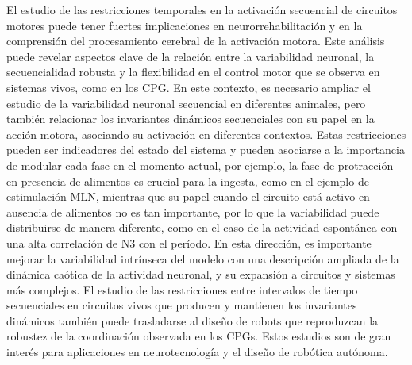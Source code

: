 El estudio de las restricciones temporales en la activación secuencial de circuitos motores puede tener fuertes implicaciones en neurorrehabilitación y en la comprensión del procesamiento cerebral de la activación motora. Este análisis puede revelar aspectos clave de la relación entre la variabilidad neuronal, la secuencialidad robusta y la flexibilidad en el control motor que se observa en sistemas vivos, como en los CPG. En este contexto, es necesario ampliar el estudio de la variabilidad neuronal secuencial en diferentes animales, pero también relacionar los invariantes dinámicos secuenciales con su papel en la acción motora, asociando su activación en diferentes contextos. Estas restricciones pueden ser indicadores del estado del sistema y pueden asociarse a la importancia de modular cada fase en el momento actual, por ejemplo, la fase de protracción en presencia de alimentos es crucial para la ingesta, como en el ejemplo de estimulación MLN, mientras que su papel cuando el circuito está activo en ausencia de alimentos no es tan importante, por lo que la variabilidad puede distribuirse de manera diferente, como en el caso de la actividad espontánea con una alta correlación de N3 con el período. En esta dirección, es importante mejorar la variabilidad intrínseca del modelo con una descripción ampliada de la dinámica caótica de la actividad neuronal, y su expansión a circuitos y sistemas más complejos. El estudio de las restricciones entre intervalos de tiempo secuenciales en circuitos vivos que producen y mantienen los invariantes dinámicos también puede trasladarse al diseño de robots que reproduzcan la robustez de la coordinación observada en los CPGs. Estos estudios son de gran interés para aplicaciones en neurotecnología y el diseño de robótica autónoma.

